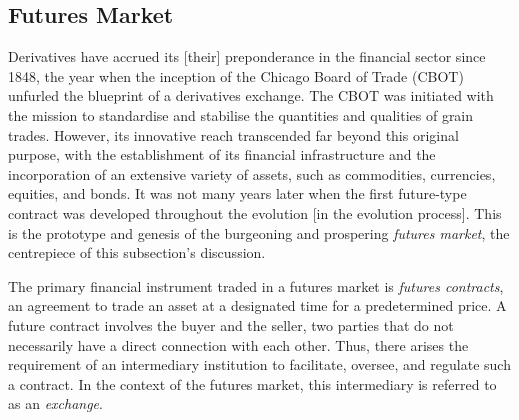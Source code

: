 \documentclass[11pt,twoside]{article}
\numberwithin{Theorem}{section}
\numberwithin{Definition}{section}
\numberwithin{Lemma}{section}
\numberwithin{Algorithm}{section}
\numberwithin{equation}{section}
\begin{document}
\subsection{Futures Market}
\label{sec:Market}
Derivatives have accrued its [their] preponderance in the financial sector since 1848, the year when the inception of the Chicago Board of Trade (CBOT) unfurled the blueprint of a derivatives exchange. The CBOT was initiated with the mission to standardise and stabilise the quantities and qualities of grain trades. However, its innovative reach transcended far beyond this original purpose, with the establishment of its financial infrastructure and the incorporation of an extensive variety of assets, such as commodities, currencies, equities, and bonds. It was not many years later when the first future-type contract was developed throughout the evolution [in the evolution process]. This is the prototype and genesis of the burgeoning and prospering \emph{futures market}, the centrepiece of this subsection's discussion.

The primary financial instrument traded in a futures market is \emph{futures contracts}, an agreement to trade an asset at a designated time for a predetermined price. A future contract involves the buyer and the seller, two parties that do not necessarily have a direct connection with each other. Thus, there arises the requirement of an intermediary institution to facilitate, oversee, and regulate such a contract. In the context of the futures market, this intermediary is referred to as an \emph{exchange}.\cite{market}
\end{document}
